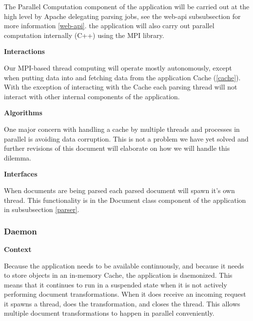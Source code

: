 The Parallel Computation component of the application will be carried out at the high level by Apache delegating parsing jobs, see the \gls{web-api} subsubsection for more information \ref{web-api}.
the application will also carry out parallel computation internally (C++) using the MPI library.

\textbf{Interactions}

Our MPI-based thread computing will operate mostly autonomously, except when putting data into and fetching data from the application Cache (\ref{cache}).
With the exception of interacting with the Cache each parsing thread will not interact with other internal components of the application.

\textbf{Algorithms}

One major concern with handling a cache by multiple threads and processes in parallel is avoiding data corruption.
This is not a problem we have yet solved and further revisions of this document will elaborate on how we will handle this dilemma.

\textbf{Interfaces}

When documents are being parsed each parsed document will spawn it's own thread.
This functionality is in the Document class component of the application in subsubsection \ref{parser}.

\subsubsection{Daemon}
\label{daemon}

\textbf{Context}

Because the application needs to be available continuously, and because it needs to store objects in an in-memory Cache, the application is daemonized.
This means that it continues to run in a suspended state when it is not actively performing document transformations.
When it does receive an incoming request it spawns a thread, does the transformation, and closes the thread.
This allows multiple document transformations to happen in parallel conveniently.

